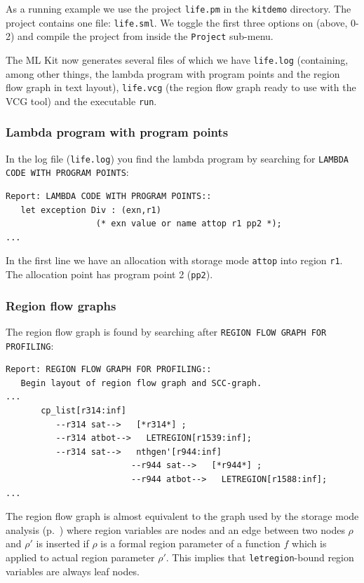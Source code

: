 \documentclass[12pt]{book}
\begin{document}
As a running example we use the project \texttt{life.pm} in the \texttt{kitdemo}
directory. The project contains one file: \texttt{life.sml}. We toggle the
first three options on (above, 0-2) and compile the project from inside
the \texttt{Project} sub-menu. 

The ML Kit now generates several files of which we have \texttt{life.log}
(containing, among other things, the lambda program with program points and the
region flow graph in text layout), \texttt{life.vcg} (the region flow graph
ready to use with the VCG tool) and the executable \texttt{run}.

\subsubsection{Lambda program with program points}
In the log file (\texttt{life.log}) you find the lambda program by searching for
\texttt{LAMBDA CODE WITH PROGRAM POINTS}:
\begin{verbatim}
Report: LAMBDA CODE WITH PROGRAM POINTS:: 
   let exception Div : (exn,r1) 
                  (* exn value or name attop r1 pp2 *);
...
\end{verbatim}
\noindent
In the first line we have an allocation with storage mode
\texttt{attop} into region \texttt{r1}. The allocation point has
program point 2 (\texttt{pp2}).

\subsubsection{Region flow graphs \label{regFlowGraph.sec}}
The region flow graph is found by searching after \texttt{REGION FLOW GRAPH
  FOR PROFILING}:\label{reg_flow_graph.ex}
\begin{verbatim}
Report: REGION FLOW GRAPH FOR PROFILING:: 
   Begin layout of region flow graph and SCC-graph.
...
       cp_list[r314:inf]
          --r314 sat-->   [*r314*] ;
          --r314 atbot-->   LETREGION[r1539:inf];
          --r314 sat-->   nthgen'[r944:inf]   
                         --r944 sat-->   [*r944*] ;
                         --r944 atbot-->   LETREGION[r1588:inf];
...
\end{verbatim}
\noindent
The region flow graph is almost equivalent to the graph used by the
storage mode analysis (p.~\pageref{region flow graph}) where region
variables are nodes and an edge between two nodes $\rho$ and $\rho'$
is inserted if $\rho$ is a formal region parameter of a function $f$
which is applied to actual region parameter $\rho'$. This implies that
\texttt{letregion}-bound region variables are always leaf nodes.
\end{document}

